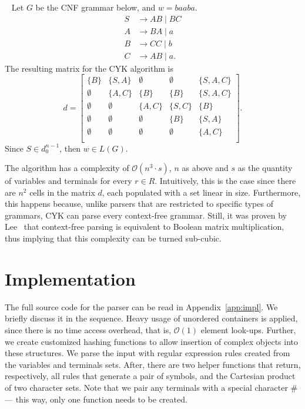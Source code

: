 \documentclass[12pt]{article}
\begin{document}
\emph{~\cite[Example 7.34.]{Hopcroft:book:2006}} Let $G$ be the CNF grammar
below, and $w = baaba$.
\begin{align*}
    S &\rightarrow AB \mid BC \\
    A &\rightarrow BA \mid a \\
    B &\rightarrow CC \mid b \\
    C &\rightarrow AB \mid a.
\end{align*}
The resulting matrix for the CYK algorithm is
\[
    d = \begin{bmatrix}
        \{B\}     & \{S, A\}  & \emptyset & \emptyset & \{S, A, C\} \\
        \emptyset & \{A, C\}  & \{B\}     & \{B\}     & \{S, A, C\} \\
        \emptyset & \emptyset & \{A, C\}  & \{S, C\}  & \{B\}       \\
        \emptyset & \emptyset & \emptyset & \{B\}     & \{S, A\}    \\
        \emptyset & \emptyset & \emptyset & \emptyset & \{A, C\}    \\
    \end{bmatrix}.
\]
Since $S \in d_{0}^{n - 1}$, then $w \in L(G)$.

The algorithm has a complexity of $\mathcal{O}(n^{3} \cdot s)$, $n$ as above
and $s$ as the quantity of variables and terminals for every $r \in R$.
Intuitively, this is the case since there are $n^{2}$ cells in the matrix $d$,
each populated with a set linear in size. Furthermore, this happens because,
unlike parsers that are restricted to specific types of grammars, CYK can parse
every context-free grammar. Still, it was proven by
Lee~\cite{Lee:article:2002:jan} that context-free parsing is equivalent to
Boolean matrix multiplication, thus implying that this complexity can be turned
sub-cubic.

\section{Implementation}\label{sec:imp}

The full source code for the parser can be read in Appendix~\ref{app:impl}. We
briefly discuss it in the sequence. Heavy usage of unordered containers is
applied, since there is no time access overhead, that is, $\mathcal{O}(1)$
element look-ups. Further, we create customized hashing functions to allow
insertion of complex objects into these structures. We parse the input with
regular expression rules created from the variables and terminals sets. After,
there are two helper functions that return, respectively, all rules that
generate a pair of symbols, and the Cartesian product of two character sets.
Note that we pair any terminals with a special character $\#$ --- this way,
only one function needs to be created.
\end{document}
